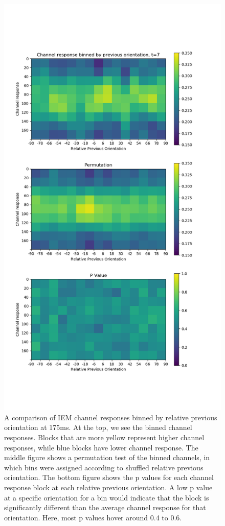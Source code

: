 \documentclass[../main.tex]{subfiles}
\begin{document}
\begin{figure}[h]
    \centering
    \includegraphics[scale=0.45]{figures/results/sd_all_t7.png}
    \caption{A comparison of IEM channel responses binned by relative previous orientation at 175ms. At the top, we see the binned channel responses. Blocks that are more yellow represent higher channel responses, while blue blocks have lower channel response. The middle figure shows a permutation test of the binned channels, in which bins were assigned according to shuffled relative previous orientation. The bottom figure shows the p values for each channel response block at each relative previous orientation. A low p value at a specific orientation for a bin would indicate that the block is significantly different than the average channel response for that orientation. Here, most p values hover around 0.4 to 0.6. }
    \label{sd_all_t7}
\end{figure}
\end{document}
